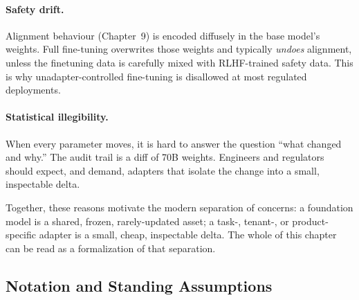 \paragraph{Safety drift.}
Alignment behaviour (Chapter~9) is encoded diffusely in the base model's
weights. Full fine-tuning overwrites those weights and typically
\emph{undoes} alignment, unless the finetuning data is carefully
mixed with RLHF-trained safety data. This is why unadapter-controlled
fine-tuning is disallowed at most regulated deployments.

\paragraph{Statistical illegibility.}
When every parameter moves, it is hard to answer the question ``what
changed and why.'' The audit trail is a diff of 70B weights. Engineers
and regulators should expect, and demand, adapters that isolate the
change into a small, inspectable delta.

Together, these reasons motivate the modern separation of concerns:
a foundation model is a shared, frozen, rarely-updated asset; a
task-, tenant-, or product-specific adapter is a small, cheap,
inspectable delta.
The whole of this chapter can be read as a formalization of that
separation.

\subsection{Notation and Standing Assumptions}
\label{sec:week7-notation}

